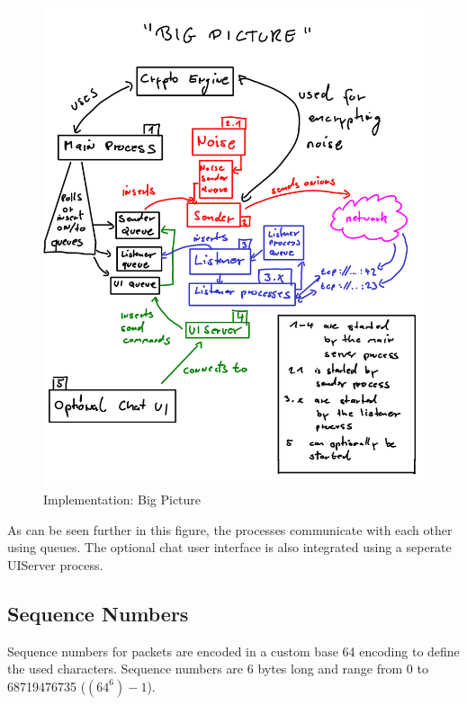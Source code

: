 \begin{figure}[htbp][htb]
\caption{Implementation: Big Picture}
\label{bigpicture}
\includegraphics[scale=0.8]{bigpicture.png}
\end{figure}
As can be seen further in this figure, the processes communicate with
each other using queues. The optional chat user interface is also
integrated using a seperate UIServer process.
\subsection{Sequence Numbers}
Sequence numbers for packets are encoded in a custom base 64 encoding to
define the used characters. Sequence numbers are 6 bytes
long and range from 0 to 68719476735 ($(64^6)-1$).

